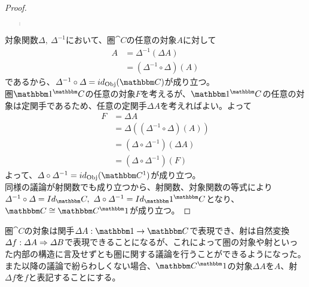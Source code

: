 \begin{proof}
\begin{quote}
\begin{mydescription}
\begin{align*}
        \end{align*}
			\end{mydescription}
		\end{quote}
    対象関数$\varDelta,\ \varDelta^{-1}$において、圏$\cat{C}$の任意の対象$A$に対して
    \begin{align*}
      A&=\varDelta^{-1}(\varDelta A)\\
      &=(\varDelta^{-1}\circ\varDelta)(A)
    \end{align*}
    であるから、$\varDelta^{-1}\circ\varDelta=id_\obj{C}$が成り立つ。\\
    圏$\funccat{C}{1}$の任意の対象$F$を考えるが、$\funccat{C}{1}$の任意の対象は定関手であるため、任意の定関手$\varDelta A$を考えればよい。よって
    \begin{align*}
      F&=\varDelta A\\
      &=\varDelta((\varDelta^{-1}\circ\varDelta)(A))\\
      &=(\varDelta\circ \varDelta^{-1})(\varDelta A)\\
      &=(\varDelta\circ \varDelta^{-1})(F)
    \end{align*}
    よって、$\varDelta\circ\varDelta^{-1}=id_\obj{C^1}$が成り立つ。\\
    同様の議論が射関数でも成り立つから、射関数、対象関数の等式により$\varDelta^{-1}\circ\varDelta=Id_\cat{C},\ \varDelta\circ\varDelta^{-1}=Id_\funccat{C}{1}$となり、$\cat{C}\cong\funccat{1}{C}$が成り立つ。
  \end{proof}
  圏$\cat{C}$の対象は関手$\functor{\varDelta A}{1}{C}$で表現でき、射は自然変換$\varDelta f:\varDelta A\Rightarrow \varDelta B$で表現できることになるが、これによって圏の対象や射といった内部の構造に言及せずとも圏に関する議論を行うことができるようになった。\\
  また以降の議論で紛らわしくない場合、$\funccat{1}{C}$の対象$\varDelta A$を$A$、射$\varDelta f$を$f$と表記することにする。
